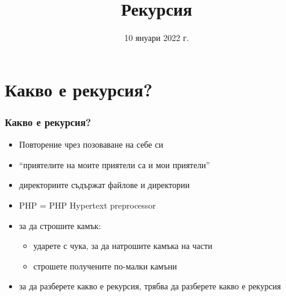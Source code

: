 \documentclass[alsotrans]{beamerswitch}
\title{Рекурсия}
\date{10 януари 2022 г.}
\begin{document}
\begin{frame}
  \titlepage
\end{frame}

\section{Какво е рекурсия?}

\begin{frame}
  \frametitle{Какво е рекурсия?}

  \begin{center}
  \end{center}
  \begin{itemize}[<+(2)->]
  \item Повторение чрез позоваване на себе си
  \item ``приятелите на моите приятели са и мои приятели''
  \item директориите съдържат файлове и директории
  \item PHP = PHP Hypertext preprocessor
  \item за да строшите камък:
    \begin{itemize}
    \item ударете с чука, за да натрошите камъка на части
    \item строшете получените по-малки камъни
    \end{itemize}
  \item за да разберете какво е рекурсия, трябва да разберете какво е рекурсия
  \end{itemize}
\end{frame}
\end{document}

